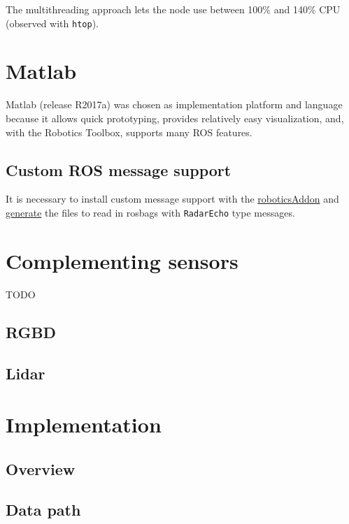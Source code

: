 The multithreading approach lets the node use between 100\% and 140\%
CPU (observed with \texttt{htop}).

\section{Matlab}\label{matlab}

Matlab (release R2017a) was chosen as implementation platform and
language because it allows quick prototyping, provides relatively easy
visualization, and, with the Robotics Toolbox, supports many ROS
features.

\subsection{Custom ROS message
support}\label{custom-ros-message-support}

It is necessary to install custom message support with the
\href{https://www.mathworks.com/help/robotics/ref/roboticsaddons.html}{roboticsAddon}
and
\href{https://www.mathworks.com/help/robotics/ug/create-custom-messages-from-ros-package.html}{generate}
the files to read in rosbags with \texttt{RadarEcho} type messages.

\section{Complementing sensors}\label{complementing-sensors}

TODO

\subsection{RGBD}\label{rgbd}

\subsection{Lidar}\label{lidar}

\section{Implementation}\label{implementation-1}

\subsection{Overview}\label{overview}

\subsection{Data path}\label{data-path}

